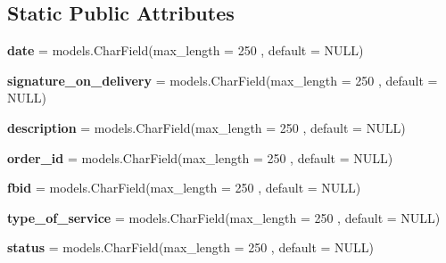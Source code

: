 \subsection*{Static Public Attributes}
\begin{DoxyCompactItemize}
\item 
\mbox{\label{classmessengerbot_1_1models_1_1order_a6369ecae66b0caf8c6c893978bb06e58}} 
{\bfseries date} = models.\+Char\+Field(max\+\_\+length = 250 , default = \textquotesingle{}N\+U\+LL\textquotesingle{})
\item 
\mbox{\label{classmessengerbot_1_1models_1_1order_a50cbfb1f416a825611c6bde4dc47543b}} 
{\bfseries signature\+\_\+on\+\_\+delivery} = models.\+Char\+Field(max\+\_\+length = 250 , default = \textquotesingle{}N\+U\+LL\textquotesingle{})
\item 
\mbox{\label{classmessengerbot_1_1models_1_1order_aa09a1fd9326424c92ad881654d92f4db}} 
{\bfseries description} = models.\+Char\+Field(max\+\_\+length = 250 , default = \textquotesingle{}N\+U\+LL\textquotesingle{})
\item 
\mbox{\label{classmessengerbot_1_1models_1_1order_a503f520fd284bace2b540ea53f76d22d}} 
{\bfseries order\+\_\+id} = models.\+Char\+Field(max\+\_\+length = 250 , default = \textquotesingle{}N\+U\+LL\textquotesingle{})
\item 
\mbox{\label{classmessengerbot_1_1models_1_1order_ab33a4244c1ba3ae3a22b9d631d7e9815}} 
{\bfseries fbid} = models.\+Char\+Field(max\+\_\+length = 250 , default = \textquotesingle{}N\+U\+LL\textquotesingle{})
\item 
\mbox{\label{classmessengerbot_1_1models_1_1order_a6e4c2508367c145a4e2aa8b4ac1dec9a}} 
{\bfseries type\+\_\+of\+\_\+service} = models.\+Char\+Field(max\+\_\+length = 250 , default = \textquotesingle{}N\+U\+LL\textquotesingle{})
\item 
\mbox{\label{classmessengerbot_1_1models_1_1order_ac6a596a6158f05339945f54ae83b02a0}} 
{\bfseries status} = models.\+Char\+Field(max\+\_\+length = 250 , default = \textquotesingle{}N\+U\+LL\textquotesingle{})

\end{DoxyCompactItemize}
